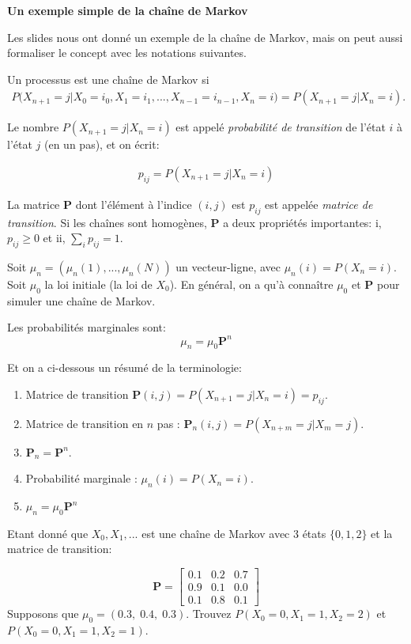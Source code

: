 \begin{Exercice}[15 minutes]\textbf{Un exemple simple de la chaîne de Markov}

Les slides nous ont donné un exemple de la chaîne de Markov, mais on peut aussi formaliser le concept avec les notations suivantes.

Un processus est une chaîne de Markov si
\begin{align} 
P\Big(X_{n+1}=j | X_0=i_0, X_1=i_1, ... , X_{n-1}=i_{n-1},X_n=i\Big) = P\left(X_{n+1}=j | X_n=i\right).
\end{align}

Le nombre $P\left(X_{n+1}=j | X_n=i\right)$ est appelé \textit{probabilité de transition} de l'état $i$ à l'état $j$ (en un pas), et on écrit:

\begin{align}
    p_{ij} = P\left(X_{n+1}=j | X_n=i\right)
\end{align}

La matrice $\mathbf{P}$ dont l'élément à l'indice $(i,j)$ est $p_{ij}$ est appelée \textit{matrice de transition}. Si les chaînes sont homogènes, $\mathbf{P}$ a deux propriétés importantes: i, $p_{ij} \geq 0$ et ii, $\sum_i p_{ij} = 1$.

Soit $\mu_n = (\mu_n(1), ..., \mu_n(N))$ un vecteur-ligne, avec $\mu_n(i) = P(X_n=i)$. Soit $\mu_0$ la loi initiale (la loi de $X_0$). En général, on a qu'à connaître $\mu_0$ et $\mathbf{P}$ pour simuler une chaîne de Markov.

Les probabilités marginales sont:
\[ 
\mu_n = \mu_0 \mathbf{P}^n
\]

Et on a ci-dessous un résumé de la terminologie:

\begin{enumerate}
    \item Matrice de transition $\mathbf{P}(i,j) = P(X_{n+1}=j|X_n=i)=p_{ij}$.
    \item Matrice de transition en $n$ pas : $\mathbf{P}_n(i,j) = P(X_{n+m}=j|X_m=j)$.
    \item $\mathbf{P}_n = \mathbf{P}^n$.
    \item Probabilité marginale : $\mu_n(i) = P(X_n = i)$.
    \item $\mu_n = \mu_0 \mathbf{P}^n$
\end{enumerate}

Etant donné que $X_0, X_1, ...$ est une chaîne de Markov avec 3 états $\{0, 1, 2\}$ et la matrice de transition:

\[ 
\mathbf{P} =
\begin{bmatrix}
0.1 & 0.2 & 0.7 \\
0.9 & 0.1 & 0.0 \\
0.1 & 0.8 & 0.1
\end{bmatrix}
\]
Supposons que $\mu_0 = (0.3, \; 0.4, \; 0.3)$. Trouvez $P(X_0 = 0, X_1=1, X_2=2)$ et $P(X_0=0, X_1=1, X_2=1)$.


\end{Exercice}
